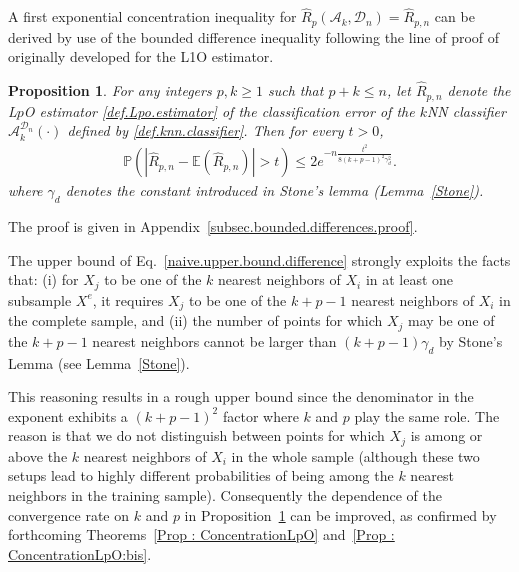 \documentclass[twoside,11pt]{article}
\numberwithin{equation}{section}
\newtheorem{prop}{Proposition}[section]
\newcommand{\prob}[1]{\mathbb{P}\left(#1 \right)}
\newcommand{\1}{\mathds{1}}%
\newcommand{\paren}[1]{\left( #1 \right)}
\newcommand{\abs}[1]{\left\lvert #1 \right\rvert} %
\newcommand{\E}{\mathbb{E}}
\newcommand{\Rh}{\widehat{R}}
\newcommand{\Rhp}{\Rh_p}
\newcommand{\D}{\mathcal{D}}
\newcommand{\Dn}{\mathcal{D}_n}
\newcommand{\A}{\mathcal{A}}
\numberwithin{equation}{section}
\theoremstyle{plain}
\begin{document}
A first exponential concentration inequality for $\Rhp(\A_k,\D_n) = \Rh_{p,n}$ can be derived by use of the bounded difference inequality following the line of proof of \citet[][Theorem~24.4]{DeGyLu_1996} originally developed for the L1O estimator.
%
\begin{prop}\label{prop.concentration.Lpo.DGL.straightforward}
%
For any integers $p,k\geq 1$ such that $ p+k\leq n$, let $\Rh_{p,n}$ denote the L$p$O estimator \eqref{def.Lpo.estimator} of the classification error of the $k$NN classifier $\A_k^{\Dn}(\cdot)$ defined by \eqref{def.knn.classifier}.
%
Then for every $t>0$,
\begin{align} \label{naive.upper.bound.difference}
  \prob{ \abs{  \Rh_{p,n} - \E\paren{ \Rh_{p,n} } } > t  } \leq 2 e^{- n \frac{t^2}{  8(k+p-1)^2 \gamma_d^2 } }.
\end{align}
where $\gamma_d$ denotes the constant introduced in Stone's lemma (Lemma~\ref{Stone}).
\end{prop}
%
The proof is given in Appendix~\ref{subsec.bounded.differences.proof}.

The upper bound of Eq.~\eqref{naive.upper.bound.difference} strongly exploits the facts that: (i) for $X_j$ to be one of the $k$ nearest neighbors of $X_i$ in at least one subsample $X^e$, it requires $X_j$ to be one of the $k+p-1$ nearest neighbors of $X_i$ in the complete sample, and (ii) the number of points for which $X_j$ may be one of the $k+p-1$ nearest neighbors cannot be larger than $(k+p-1)\gamma_d$ by Stone's Lemma (see Lemma~\ref{Stone}).

This reasoning results in a rough upper bound since the denominator in the exponent exhibits a $(k+p-1)^2 $ factor where $k$ and $p$ play the same role.
%
The reason is that we do not distinguish between points for which $X_j$ is among or above the $k$ nearest neighbors of $X_i$ in the whole sample (although these two setups lead to highly different probabilities of being among the $k$ nearest neighbors in the training sample).
%
Consequently the dependence of the convergence rate on $k$ and $p$ in Proposition~\ref{prop.concentration.Lpo.DGL.straightforward} can be improved, as confirmed by forthcoming Theorems~\ref{Prop : ConcentrationLpO} and~\ref{Prop : ConcentrationLpO:bis}.



\medskip
\end{document}

